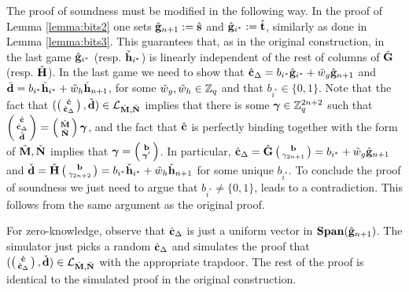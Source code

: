 The proof of soundness must be modified in the following way.  In the proof of Lemma \ref{lemma:bits2} one sets $\hat{\mathbf{g}}_{n+1}:={\hat{\mathbf{s}}}$ and $\hat{\mathbf{g}}_{i^*}:={\hat{\mathbf{t}}}$, similarly as done in Lemma \ref{lemma:bits3}. This guarantees that, as in the original construction, in the last game  $\hat{\mathbf{g}}_{i^*}$ (resp. $\check{\mathbf{h}}_{i^*}$) is linearly independent of the rest of columns of $\hat{\mathbf{{G}}}$ (resp. $\check{\mathbf{{H}}}$). In the last game we need to show that ${\hat{\mathbf{c}}}_{\Delta}=b_{i^*}\hat{\mathbf{g}}_{i^*}+\tilde{w}_g\hat{\mathbf{g}}_{n+1}$ and $\check{\mathbf{d}}=b_{i^*}\check{\mathbf{h}}_{i^*}+\tilde{w}_h\check{\mathbf{h}}_{n+1}$, for some $\tilde{w}_g,\tilde{w}_h\in\mathbb{Z}_q$ and that $b_{i^*} \in \{0,1\}$. Note that the fact that $(\left(\begin{smallmatrix}{\hat{\mathbf{c}}}\\{\hat{\mathbf{c}}}_\Delta\end{smallmatrix}\right), \check{\mathbf{d}})\in\mathcal{L}_{{\hat{\mathbf{{M}}}},\check{\mathbf{{N}}}}$ implies that there is some ${\boldsymbol \gamma}\in\mathbb{Z}_q^{2n+2}$ such that $\left(\begin{smallmatrix}{\hat{\mathbf{c}}}\\{\hat{\mathbf{c}}}_\Delta\\\check{\mathbf{d}}\end{smallmatrix}\right)=\left(\begin{smallmatrix}{\hat{\mathbf{{M}}}}\\\check{\mathbf{{N}}}\end{smallmatrix}\right){\boldsymbol \gamma}$, and the fact that ${\hat{\mathbf{c}}}$ is perfectly binding together with the form of ${\hat{\mathbf{{M}}}},\check{\mathbf{{N}}}$ implies that ${\boldsymbol \gamma}=\left(\begin{smallmatrix}\mathbf{b}\\{\boldsymbol \gamma}'\end{smallmatrix}\right)$. In particular, ${\hat{\mathbf{c}}}_\Delta = \hat{\mathbf{{G}}}\left(\begin{smallmatrix}\mathbf{b}\\\gamma_{2n+1}\end{smallmatrix}\right)=b_{i^*}+\tilde{w}_g\hat{\mathbf{g}}_{n+1}$ and $\check{\mathbf{d}}=\check{\mathbf{{H}}}\left(\begin{smallmatrix}\mathbf{b}\\\gamma_{2n+2}\end{smallmatrix}\right)=b_{i^*}\check{\mathbf{h}}_{i^*}+\tilde{w}_h\check{\mathbf{h}}_{n+1}$ for some unique $b_{i^*}$. To conclude the proof of soundness we just need to argue that $b_{i^*} \neq \{0,1\}$, leads to a contradiction. This follows from the same argument as the original proof. 


For zero-knowledge, observe that ${\hat{\mathbf{c}}}_{\Delta}$ is just a uniform vector in $\mathbf{Span}(\hat{\mathbf{g}}_{n+1})$. The simulator just picks a random ${\hat{\mathbf{c}}}_{\Delta}$ and simulates the proof that $(\left(\begin{smallmatrix}{\hat{\mathbf{c}}}\\{\hat{\mathbf{c}}}_\Delta\end{smallmatrix}\right), \check{\mathbf{d}})\in\mathcal{L}_{{\hat{\mathbf{{M}}}},\check{\mathbf{{N}}}}$ with the appropriate trapdoor. The rest of the proof is identical to the simulated proof in the original construction.  


